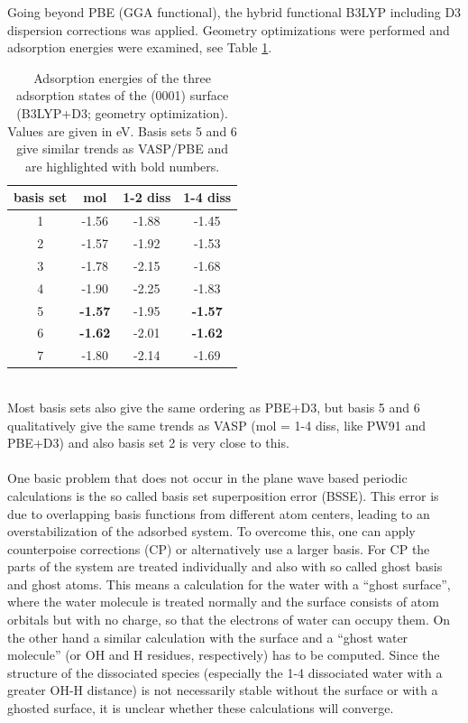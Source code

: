 \documentclass[11pt,DIV=13,BCOR=5mm,a4paper,headinclude]{scrbook}
\begin{document}
Going beyond PBE (GGA functional), the hybrid functional B3LYP including D3 dispersion corrections was applied.
Geometry optimizations were performed and adsorption energies were examined, see Table \ref{tab:basisset-results-B3LYP+D3}.
 \begin{table}[!h]
  \centering
   \caption{Adsorption energies of the three adsorption states of the (0001) surface (B3LYP+D3; geometry optimization).
Values are given in eV.
Basis sets 5 and 6 give similar trends as VASP/PBE and are highlighted with bold numbers.}
  \begin{tabular}{c|ccc}
  \toprule
  basis set & mol & 1-2 diss & 1-4 diss \\\midrule
  1 &-1.56 &-1.88 &-1.45 \\
  2 &-1.57 &-1.92 &-1.53 \\
  3 &-1.78 &-2.15 &-1.68 \\
  4 &-1.90 &-2.25 &-1.83 \\
  5 &\textbf{-1.57} &-1.95 &\textbf{-1.57} \\
  6 &\textbf{-1.62} &-2.01 &\textbf{-1.62} \\
  7 &-1.80 &-2.14 &-1.69 \\\bottomrule
  \end{tabular}
  \label{tab:basisset-results-B3LYP+D3}
\end{table}
\\
Most basis sets also give the same ordering as PBE+D3, but basis 5 and 6 qualitatively give the same trends as VASP (mol = 1-4 diss, like PW91 and PBE+D3) and also basis set 2 is very close to this.
\\
\\

One basic problem that does not occur in the plane wave based periodic calculations is the so called basis set superposition error (BSSE).
This error is due to overlapping basis functions from different atom centers, leading to an overstabilization of the adsorbed system.
To overcome this, one can apply counterpoise corrections (CP) or alternatively use a larger basis.
For CP the parts of the system are treated individually and also with so called ghost basis and ghost atoms.
This means a calculation for the water with a ``ghost surface'', where the water molecule is treated normally and the surface consists of atom orbitals but with no charge, so that the electrons of water can occupy them.
On the other hand a similar calculation with the surface and a ``ghost water molecule'' (or OH and H residues, respectively) has to be computed.
Since the structure of the dissociated species (especially the 1-4 dissociated water with a greater OH-H distance) is not necessarily stable without the surface or with a ghosted surface, it is unclear whether these calculations will converge.
\\
\end{document}
